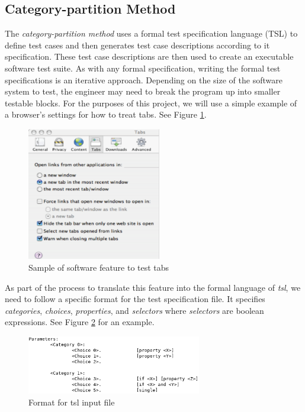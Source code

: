 \documentclass[a4full,12pt]{article}
\begin{document}
\subsection{Category-partition Method}
The \emph{category-partition method} uses a formal test specification language (TSL) to define
test cases and then generates test case descriptions according to it specification. These test case descriptions are then used to
  create an executable software test suite. As with any formal specification, writing the formal test 
  specifications is an iterative approach. Depending on the size of the software system to test, the 
  engineer may need to break the program up into smaller testable blocks. For 
  the purposes of this project, we will use a simple example of a browser's 
  settings for how to treat tabs. See Figure \ref{fig:tabs_example}.
\begin{figure}[htb]
\centering
\includegraphics[width=2.3in,keepaspectratio]{images/tabs_example.png}
\caption{Sample of software feature to test tabs}
\label{fig:tabs_example}
\end{figure}

As part of the process to translate this feature into the formal language of \emph{tsl},
  we need to follow a specific format for the test specification file. It specifies
  \emph{categories}, \emph{choices}, \emph{properties}, and \emph{selectors} where 
  \emph{selectors} are boolean expressions. See Figure \ref{fig:tsl_format} for an example.
\begin{figure}[htb]
\centering
\includegraphics[width=3in,keepaspectratio]{images/tsl_format.png}
\caption{Format for tsl input file}
\label{fig:tsl_format}
\end{figure}
\end{document}
